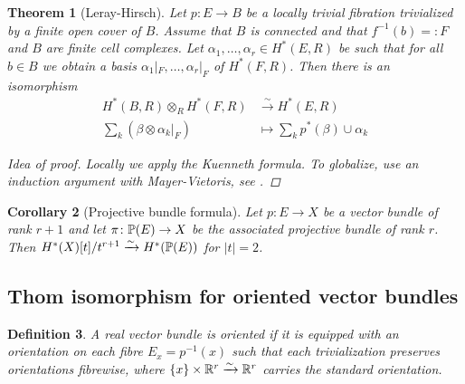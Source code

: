 \documentclass[A4paper, british]{amsart}
\theoremstyle{darkgreentheorem}
\newtheorem{thm}{Theorem}[section]
\newtheorem{cor}[thm]{Corollary}
\theoremstyle{darkbluedefinition}
\newtheorem{defn}[thm]{Definition}
\theoremstyle{darkredexample}
\theoremstyle{remark}
\newcommand{\1}{\mathbbm{1}}
\newcommand{\ot}{\otimes}
\begin{document}
\begin{thm}[Leray-Hirsch]
    Let $p\colon E\to B$ be a locally trivial fibration trivialized by a finite open cover of $B$.
    Assume that $B$ is connected and that $f^{-1}(b)=:F$ and $B$ are finite cell complexes.
    Let $\alpha_{1},\ldots,\alpha_{r}\in H^{*}(E,R)$ be such that for all $b\in B$ we obtain a basis $\alpha_{1}|_{F},\ldots,\alpha_{r}|_{F}$ of $H^{*}(F,R)$.
    Then there is an isomorphism
    \begin{align*}
	H^{*}(B,R)\ot_{R} H^{*}(F,R) & \xrightarrow{\sim} H^{*}(E,R) \\
	\sum_{k}(\beta\ot \alpha_{k}|_{F}) & \mapsto \sum_{k}p^{*}(\beta)\cup \alpha_{k}
    \end{align*}
    \begin{proof}[Idea of proof]
	Locally we apply the Kuenneth formula.
	To globalize, use an induction argument with Mayer-Vietoris, see \cite[Section 4.D]{hat01}.
    \end{proof}
\end{thm}

\begin{cor}[Projective bundle formula]
    Let $p\colon E\to X$ be a vector bundle of rank $r+1$ and let $\pi\colon \P(E)\to X$ be the associated projective bundle of rank $r$.
    Then $H^{*}(X)[t]/t^{r+1} \xrightarrow{\sim} H^{*}(\P(E))$ for $|t|=2$.
\end{cor}

\subsection{Thom isomorphism for oriented vector bundles}

\begin{defn}
    A real vector bundle is \textit{oriented} if it is equipped with an orientation on each fibre $E_{x}=p^{-1}(x)$ such that each trivialization preserves orientations fibrewise, where $\{x\}\times \R^{r}\xrightarrow{\sim}\R^{r}$ carries the standard orientation.
\end{defn}
\end{document}
